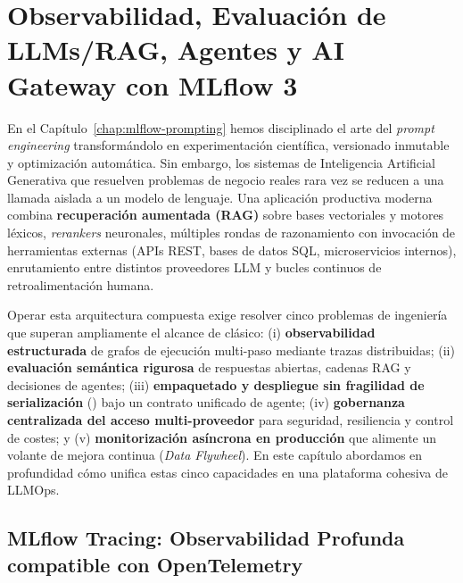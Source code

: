 
\chapter[Observabilidad, Evaluación RAG, Agentes y AI Gateway]{Observabilidad, Evaluación de LLMs/RAG, Agentes y AI Gateway con MLflow 3}\label{chap:mlflow-llms}

En el Capítulo~\ref{chap:mlflow-prompting} hemos disciplinado el arte del \textit{prompt engineering} transformándolo en experimentación científica, versionado inmutable y optimización automática. Sin embargo, los sistemas de Inteligencia Artificial Generativa que resuelven problemas de negocio reales rara vez se reducen a una llamada aislada a un modelo de lenguaje. Una aplicación productiva moderna combina \textbf{recuperación aumentada (RAG)} sobre bases vectoriales y motores léxicos, \textit{rerankers} neuronales, múltiples rondas de razonamiento con invocación de herramientas externas (APIs REST, bases de datos SQL, microservicios internos), enrutamiento entre distintos proveedores LLM y bucles continuos de retroalimentación humana.

Operar esta arquitectura compuesta exige resolver cinco problemas de ingeniería que superan ampliamente el alcance de  clásico: (i) \textbf{observabilidad estructurada} de grafos de ejecución multi-paso mediante trazas distribuidas; (ii) \textbf{evaluación semántica rigurosa} de respuestas abiertas, cadenas RAG y decisiones de agentes; (iii) \textbf{empaquetado y despliegue sin fragilidad de serialización} () bajo un contrato unificado de agente; (iv) \textbf{gobernanza centralizada del acceso multi-proveedor} para seguridad, resiliencia y control de costes; y (v) \textbf{monitorización asíncrona en producción} que alimente un volante de mejora continua (\textit{Data Flywheel}). En este capítulo abordamos en profundidad cómo  unifica estas cinco capacidades en una plataforma cohesiva de LLMOps.

\section[MLflow Tracing (OpenTelemetry)]{MLflow Tracing: Observabilidad Profunda compatible con OpenTelemetry}\label{sec:mlflow-tracing}

